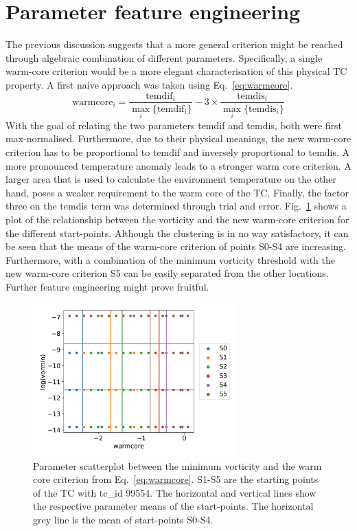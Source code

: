 \section{Parameter feature engineering}
The previous discussion suggests that a more general criterion might be reached through algebraic combination of different parameters. Specifically, a single warm-core criterion would be a more elegant characterisation of this physical TC property. A first naive approach was taken using Eq.~\ref{eq:warmcore}.
\begin{equation}
  \text{warmcore}_i = \frac{\text{temdif}_i}{\max_{i}\{ \text{temdif}_i\}} - 3 \times \frac{\text{temdis}_i}{\max_i\{ \text{temdis}_i\}}
  \label{eq:warmcore}
\end{equation}
With the goal of relating the two parameters temdif and temdis, both were first max-normalised. Furthermore, due to their physical meanings, the new warm-core criterion has to be proportional to temdif and inversely proportional to temdis. A more pronounced temperature anomaly leads to a stronger warm core criterion. A larger area that is used to calculate the environment temperature on the other hand, poses a weaker requirement to the warm core of the TC. Finally, the factor three on the temdis term was determined through trial and error.
Fig.~\ref{fig:clustering} shows a plot of the relationship between the vorticity and the new warm-core criterion for the different start-points. Although the clustering is in no way satisfactory, it can be seen that the means of the warm-core criterion of points S0-S4 are increasing. Furthermore, with a combination of the minimum vorticity threshold with the new warm-core criterion S5 can be easily separated from the other locations. Further feature engineering might prove fruitful.

\begin{figure}[!htb]
	\centering
	\includegraphics[width=0.7\textwidth]{img/combined_warmcore_criterion.png}
	\caption{Parameter scatterplot between the minimum vorticity and the warm core criterion from Eq.~\ref{eq:warmcore}. S1-S5 are the starting points of the TC with tc\_id 99554. The horizontal and vertical lines show the respective parameter means of the start-points. The horizontal grey line is the mean of start-points S0-S4.}
	\label{fig:clustering}
\end{figure}

